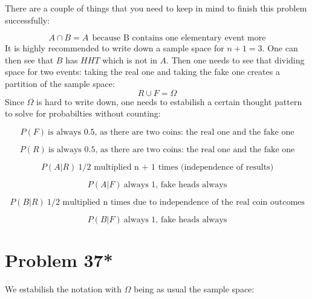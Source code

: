 \documentclass{article}
\begin{document}
There are a couple of things that you need to keep in mind to finish this problem successfully:

\begin{equation*}
    A \cap B = A \ \ \mbox{because B contains one elementary event more}
\end{equation*}
It is highly recommended to write down a sample space for \(n + 1 = 3\). One can then see
that \(B\) has \(HHT\) which is not in \(A\). Then one needs to see that dividing space
for two events: taking the real one and taking the fake one creates a partition of the sample space:
\begin{equation*}
    R \cup F = \Omega
\end{equation*}
Since \(\Omega\) is hard to write down, one needs to estabilish a certain thought pattern to solve
for probabilties without counting:

\begin{equation*}
    P(F) \ \mbox{is always 0.5, as there are two coins: the real one and the fake one}
\end{equation*}

\begin{equation*}
    P(R) \ \mbox{is always 0.5, as there are two coins: the real one and the fake one}
\end{equation*}

\begin{equation*}
    P(A|R) \ \mbox{1/2 multiplied n + 1 times (independence of results)}
\end{equation*}

\begin{equation*}
    P(A|F) \ \mbox{always 1, fake heads always}
\end{equation*}

\begin{equation*}
    P(B|R) \ \mbox{1/2 multiplied n times due to independence of the real coin outcomes}
\end{equation*}

\begin{equation*}
    P(B|F) \ \mbox{always 1, fake heads always}
\end{equation*}


\section*{Problem 37*}
We estabilish the notation with \(\Omega\) being as usual the sample space:
\end{document}

